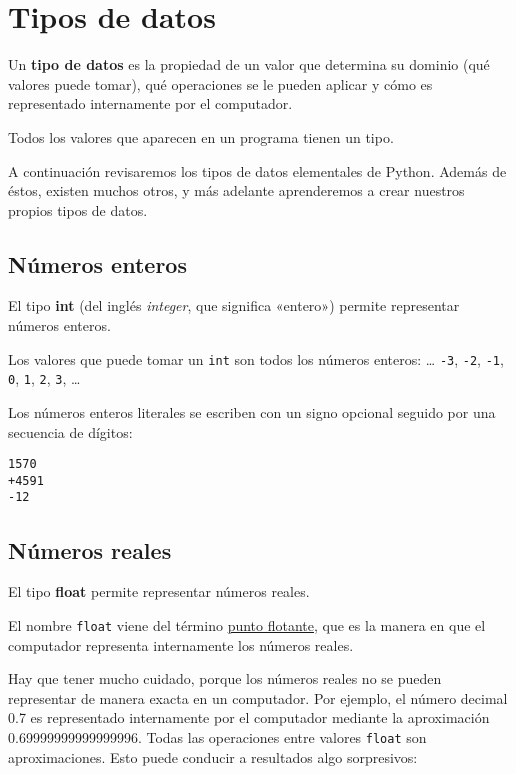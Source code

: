 \chapter{Tipos de datos}

Un \textbf{tipo de datos} es la propiedad de un valor que determina su
dominio (qué valores puede tomar), qué operaciones se le pueden aplicar
y cómo es representado internamente por el computador.

Todos los valores que aparecen en un programa tienen un tipo.

A continuación revisaremos los tipos de datos elementales de Python.
Además de éstos, existen muchos otros, y más adelante aprenderemos a
crear nuestros propios tipos de datos.

\section{Números enteros}

El tipo \textbf{int} (del inglés \emph{integer}, que significa «entero»)
permite representar números enteros.

Los valores que puede tomar un \lstinline!int! son todos los números
enteros: \ldots{} \lstinline!-3!, \lstinline!-2!, \lstinline!-1!,
\lstinline!0!, \lstinline!1!, \lstinline!2!, \lstinline!3!, \ldots{}

Los números enteros literales se escriben con un signo opcional seguido
por una secuencia de dígitos:

\begin{lstlisting}
1570
+4591
-12
\end{lstlisting}

\section{Números reales}

El tipo \textbf{float} permite representar números reales.

El nombre \lstinline!float! viene del término
\href{http://es.wikipedia.org/wiki/Punto\_flotante}{punto flotante}, que
es la manera en que el computador representa internamente los números
reales.

Hay que tener mucho cuidado, porque los números reales no se pueden
representar de manera exacta en un computador. Por ejemplo, el número
decimal 0.7 es representado internamente por el computador mediante la
aproximación 0.69999999999999996. Todas las operaciones entre valores
\lstinline!float! son aproximaciones. Esto puede conducir a resultados
algo sorpresivos:

